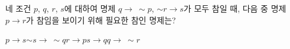 네 조건 $p$, $q$, $r$, $s$에 대하여 명제 $q\longrightarrow\ \sim p$, $\sim r\longrightarrow s$가 모두 참일 때, 다음 중 명제 $p\longrightarrow r$가 참임을 보이기 위해 필요한 참인 명제는?
\begin{choices32}{$p\longrightarrow s$}{$\sim s\longrightarrow\ \sim q$}{$r\longrightarrow p$}{$s\longrightarrow q$}{$q\longrightarrow\ \sim r$}\end{choices32}
